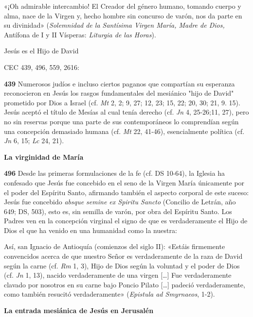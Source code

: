 \documentclass[]{article}
\begin{document}
«¡Oh admirable intercambio! El Creador del género humano, tomando cuerpo
y alma, nace de la Virgen y, hecho hombre sin concurso de varón, nos da
parte en su divinidad» (\emph{Solemnidad de la Santísima Virgen María,
Madre de Dios,} Antífona de I y II Vísperas: \emph{Liturgia de las
Horas}).

Jesús es el Hijo de David

CEC 439, 496, 559, 2616:

\textbf{439} Numerosos judíos e incluso ciertos paganos que compartían
su esperanza reconocieron en Jesús los rasgos fundamentales del
mesiánico "hijo de David" prometido por Dios a Israel (cf. \emph{Mt} 2,
2; 9, 27; 12, 23; 15, 22; 20, 30; 21, 9. 15). Jesús aceptó el título de
Mesías al cual tenía derecho (cf. \emph{Jn} 4, 25-26;11, 27), pero no
sin reservas porque una parte de sus contemporáneos lo comprendían según
una concepción demasiado humana (cf. \emph{Mt} 22, 41-46), esencialmente
política (cf. \emph{Jn} 6, 15; \emph{Lc} 24, 21).

\textbf{La virginidad de María}

\textbf{496} Desde las primeras formulaciones de la fe (cf. DS 10-64),
la Iglesia ha confesado que Jesús fue concebido en el seno de la Virgen
María únicamente por el poder del Espíritu Santo, afirmando también el
aspecto corporal de este suceso: Jesús fue concebido \emph{absque semine
ex Spiritu Sancto} (Concilio de Letrán, año 649; DS, 503), esto es, sin
semilla de varón, por obra del Espíritu Santo. Los Padres ven en la
concepción virginal el signo de que es verdaderamente el Hijo de Dios el
que ha venido en una humanidad como la nuestra:

Así, san Ignacio de Antioquía (comienzos del siglo II): «Estáis
firmemente convencidos acerca de que nuestro Señor es verdaderamente de
la raza de David según la carne (cf. \emph{Rm} 1, 3), Hijo de Dios según
la voluntad y el poder de Dios (cf. \emph{Jn} 1, 13), nacido
verdaderamente de una virgen [\ldots{}] Fue verdaderamente clavado por
nosotros en su carne bajo Poncio Pilato [\ldots{}] padeció
verdaderamente, como también resucitó verdaderamente» (\emph{Epistula ad
Smyrnaeos}, 1-2).

\textbf{La entrada mesiánica de Jesús en Jerusalén}
\end{document}
